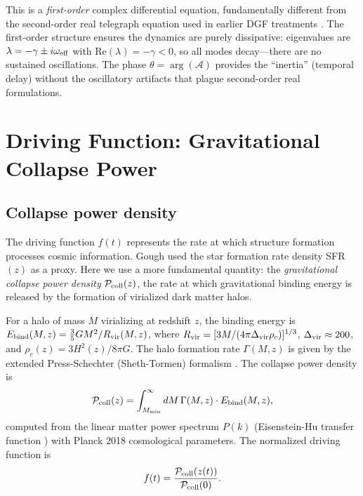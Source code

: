 \documentclass[aps,prd,twocolumn,superscriptaddress]{revtex4-2}
\begin{document}
This is a \emph{first-order} complex differential equation, fundamentally different from the second-order real telegraph equation used in earlier DGF treatments \cite{DGF:2024}. The first-order structure ensures the dynamics are purely dissipative: eigenvalues are $\lambda = -\gamma \pm i\omega_{\rm eff}$ with $\text{Re}(\lambda) = -\gamma < 0$, so all modes decay---there are no sustained oscillations. The phase $\theta = \arg(\mathcal{A})$ provides the ``inertia'' (temporal delay) without the oscillatory artifacts that plague second-order real formulations.

\section{Driving Function: Gravitational Collapse Power}
\label{sec:driver}

\subsection{Collapse power density}

The driving function $f(t)$ represents the rate at which structure formation processes cosmic information. Gough \cite{Gough:2025} used the star formation rate density SFR$(z)$ as a proxy. Here we use a more fundamental quantity: the \emph{gravitational collapse power density} $\mathcal{P}_{\rm coll}(z)$, the rate at which gravitational binding energy is released by the formation of virialized dark matter halos.

For a halo of mass $M$ virializing at redshift $z$, the binding energy is $E_{\rm bind}(M,z) = \frac{3}{5}GM^2/R_{\rm vir}(M,z)$, where $R_{\rm vir} = [3M/(4\pi\Delta_{\rm vir}\rho_c)]^{1/3}$, $\Delta_{\rm vir} \approx 200$, and $\rho_c(z) = 3H^2(z)/8\pi G$. The halo formation rate $\Gamma(M,z)$ is given by the extended Press-Schechter (Sheth-Tormen) formalism \cite{Sheth:1999}. The collapse power density is
\begin{equation}
\mathcal{P}_{\rm coll}(z) = \int_{M_{\rm min}}^{\infty} dM \, \Gamma(M,z) \cdot E_{\rm bind}(M,z),
\label{eq:pcoll}
\end{equation}
computed from the linear matter power spectrum $P(k)$ (Eisenstein-Hu transfer function \cite{Eisenstein:1998}) with Planck 2018 cosmological parameters. The normalized driving function is
\begin{equation}
f(t) = \frac{\mathcal{P}_{\rm coll}(z(t))}{\mathcal{P}_{\rm coll}(0)}.
\label{eq:fdrive}
\end{equation}
\end{document}
